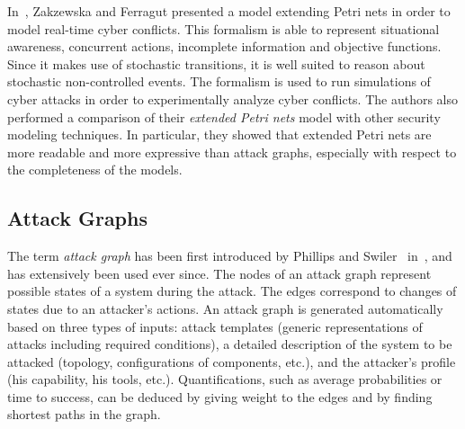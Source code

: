 \documentclass[a4paper]{article}
\begin{document}
In~\cite{ZaFe}, Zakzewska and Ferragut presented a model extending Petri nets 
in order to model real-time cyber conflicts. This formalism is able to 
represent situational awareness, concurrent actions, incomplete information and 
objective functions. Since it makes use of stochastic transitions, it is well 
suited to reason about stochastic non-controlled events. The formalism is used 
to run simulations of cyber attacks in order to experimentally analyze 
cyber conflicts. The authors also performed a 
comparison of their \emph{extended Petri nets} model with other security 
modeling techniques. In particular, they showed that extended Petri 
nets are more readable and more expressive than attack graphs, especially with 
respect to the completeness of the models. 

\subsection{Attack Graphs}
\label{sec:attack_graphs}

The term \emph{attack graph} has been first introduced by Phillips and 
Swiler~\cite{PhSw,SwPhElCh} in~, and has extensively been used ever 
since. The nodes of an attack graph represent possible states of a system during
the attack. The edges correspond to changes of states due to an attacker's 
actions. An attack graph is generated automatically based on three types of
inputs: attack templates (generic representations of attacks including required
conditions), a detailed description of the system to be attacked  (topology,
configurations of components, etc.), and the attacker's profile (his 
capability, his tools, etc.). Quantifications, such as average probabilities or 
time to success, can be deduced by giving  weight to the edges and by finding
shortest paths in the graph.
\end{document}
